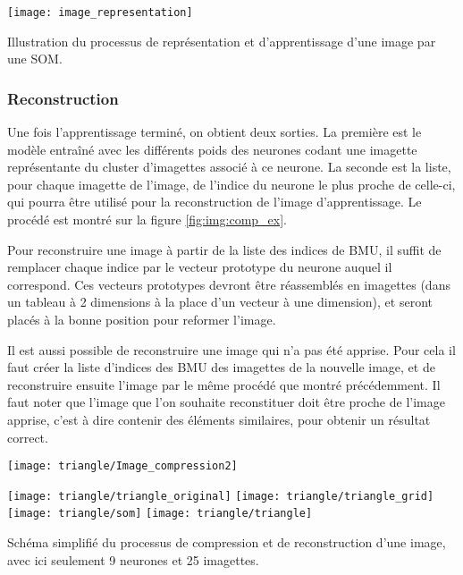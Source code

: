 	\begin{figureth}
		\texttt{[image: image\_representation]}
		\caption[Représentation d'une image]{Illustration du processus de représentation et d'apprentissage d'une image par une SOM.}\label{fig:img:dec}
	\end{figureth}

	\subsubsection{Reconstruction}

	Une fois l'apprentissage terminé, on obtient deux sorties. La première est le modèle entraîné avec les différents poids des neurones codant une imagette représentante du cluster d'imagettes associé à ce neurone. La seconde est la liste, pour chaque imagette de l'image, de l'indice du neurone le plus proche de celle-ci, qui pourra être utilisé pour la reconstruction de l'image d'apprentissage. Le procédé est montré sur la figure \ref{fig:img:comp_ex}.

	Pour reconstruire une image à partir de la liste des indices de BMU, il suffit de remplacer chaque indice par le vecteur prototype du neurone auquel il correspond. Ces vecteurs prototypes devront être réassemblés en imagettes (dans un tableau à 2 dimensions à la place d'un vecteur à une dimension), et seront placés à la bonne position pour reformer l'image.

	Il est aussi possible de reconstruire une image qui n'a pas été apprise. Pour cela il faut créer la liste d'indices des BMU des imagettes de la nouvelle image, et de reconstruire ensuite l'image par le même procédé que montré précédemment. Il faut noter que l'image que l'on souhaite reconstituer doit être proche de l'image apprise, c'est à dire contenir des éléments similaires, pour obtenir un résultat correct.

	\begin{figureth}
		\begin{subfigureth}{\textwidth}
			\texttt{[image: triangle/Image\_compression2]}
		\end{subfigureth}
		\begin{subfigureth}{\textwidth}
			\texttt{[image: triangle/triangle\_original]}\hfill
			\texttt{[image: triangle/triangle\_grid]}\hfill
			\texttt{[image: triangle/som]}\hfill
			\texttt{[image: triangle/triangle]}
		\end{subfigureth}
		\caption[Compression et décompression d'image]{Schéma simplifié du processus de compression et de reconstruction d'une image, avec ici seulement 9 neurones et 25 imagettes.}\label{fig:img:comp_ex}
	\end{figureth}

